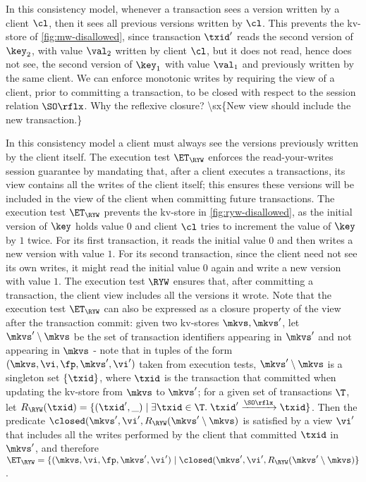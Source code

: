 In this consistency model, whenever a transaction sees a version written by a client $\cl$,
then it sees all previous versions written by $\cl$. 
This prevents \eg the kv-store of \cref{fig:mw-disallowed}, since 
transaction $\txid'$ reads the second version of $\key_2$, 
with value $\val_2$ written by client $\cl$, 
but it does not read, hence does not see, the second version of $\key_1$
with value $\val_1$ and previously written by the same client. 
We can enforce monotonic writes by requiring the view of a client, prior to committing 
a transaction, to be closed with respect to the session relation $\SO\rflx$.
\ac{Why the reflexive closure? \sx{New view should include the new transaction.}}

In this consistency model a client must always see the versions previously written by the client itself. 
The execution test $\ET_{\RYW}$ enforces the read-your-writes session guarantee by 
mandating that, after a client executes a transactions, its view contains all the writes of the client 
itself; this ensures these versions will be included in the view of the client when committing future 
transactions.
The execution test $\ET_{\RYW}$ prevents the kv-store in \cref{fig:ryw-disallowed}, 
as the initial version of $\key$ holds value $0$ 
and client $\cl$ tries to increment the value of $\key$ by $1$ twice.  
For its first transaction, it reads the initial value $0$ and then writes a new version with value $1$. 
For its second transaction, since the client need not see its own writes, 
it might read the initial value $0$ again and write a new version with value $1$.
The execution test $\RYW$ ensures that, after committing a transaction, 
the client view includes all the versions it wrote.  
Note that the execution test $\ET_{\RYW}$ can also be expressed 
as a closure property of the view after the transaction commit: given 
two kv-stores $\mkvs, \mkvs'$, let  
$\mkvs' \setminus \mkvs$ be the set of transaction identifiers appearing 
in $\mkvs'$ and not appearing in $\mkvs$ - note that in tuples of the form 
$(\mkvs, \vi, \fp, \mkvs', \vi')$ taken from execution tests, $\mkvs' \setminus \mkvs$ 
is a singleton set $\{\txid\}$, where $\txid$ is the transaction that committed 
when updating the kv-store from $\mkvs$ to $\mkvs'$; for a given 
set of transactions $\T$, let $R_{\RYW}(\txid) = \{(\txid', \_) \mid \exists \txid \in \T.\; \txid' \xrightarrow{\SO\rflx} \txid\}$. 
Then the predicate $\closed(\mkvs', \vi', R_{\RYW}(\mkvs' \setminus \mkvs)$ is satisfied by a 
view $\vi'$ that includes all the writes performed by the client that committed $\txid$ in $\mkvs'$, 
and therefore $\ET_{\RYW} = \{(\mkvs, \vi, \fp, \mkvs', \vi') \mid \closed(\mkvs', \vi', R_{\RYW}(\mkvs' \setminus \mkvs)\}$.
 
